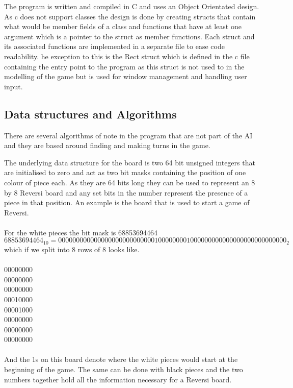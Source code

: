 \documentclass[final]{cmpreport}
\begin{document}
The program is written and compiled in C and uses an Object Orientated design. As c does not support classes the design is done by creating structs that contain what would be member fields of a class and functions that have at least  one argument which is a pointer to the struct as member functions. Each struct and its associated functions are implemented in a separate file to ease code readability. he exception to this is the Rect struct which is defined in the c file containing the entry point to the program as this struct is not used to in the modelling of the game but is used for window management and handling user input.
\subsection{Data structures and Algorithms}
There are several algorithms of note in the program that are not part of the AI and they are based around finding and making turns in the game. 

The underlying data structure for the board is two 64 bit unsigned integers that are initialised to zero and act as two bit masks containing the position of one colour of piece each. As they are 64 bits long they can be used to represent an 8 by 8 Reversi board and any set bits in the number represent the presence of a piece in that position. An example is the board that is used to start a game of Reversi.
\\
\\For the white pieces the bit mask is 68853694464
$$68853694464_{10} = 0000000000000000000000000001000000001000000000000000000000000000_2$$
which if we split into 8 rows of 8 looks like.
\\
\\
00000000\\
00000000\\
00000000\\
00010000\\
00001000\\
00000000\\
00000000\\
00000000\\
\\
And the 1s on this board denote where the white pieces would start at the beginning of the game. The same can be done with black pieces and the two numbers together hold all the information necessary for a Reversi board.
\end{document}
